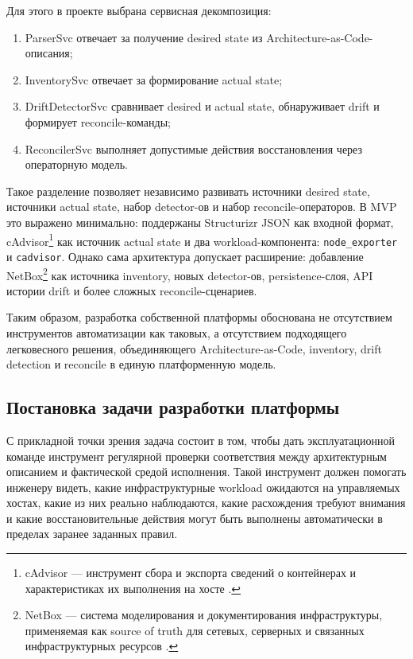 Для этого в проекте выбрана сервисная декомпозиция:
\begin{enumerate}
    \item ParserSvc отвечает за получение desired state из Architecture-as-Code-описания;
    \item InventorySvc отвечает за формирование actual state;
    \item DriftDetectorSvc сравнивает desired и actual state, обнаруживает drift и формирует reconcile-команды;
    \item ReconcilerSvc выполняет допустимые действия восстановления через операторную модель.
\end{enumerate}

Такое разделение позволяет независимо развивать источники desired state, источники actual state, набор detector-ов и набор reconcile-операторов. В MVP это выражено минимально: поддержаны Structurizr JSON как входной формат, cAdvisor\footnote{cAdvisor --- инструмент сбора и экспорта сведений о контейнерах и характеристиках их выполнения на хосте \cite{cadvisor_docs}.} как источник actual state и два workload-компонента: \texttt{node\_exporter} и \texttt{cadvisor}. Однако сама архитектура допускает расширение: добавление NetBox\footnote{NetBox --- система моделирования и документирования инфраструктуры, применяемая как source of truth для сетевых, серверных и связанных инфраструктурных ресурсов \cite{netbox_docs}.} как источника inventory, новых detector-ов, persistence-слоя, API истории drift и более сложных reconcile-сценариев.

Таким образом, разработка собственной платформы обоснована не отсутствием инструментов автоматизации как таковых, а отсутствием подходящего легковесного решения, объединяющего Architecture-as-Code, inventory, drift detection и reconcile в единую платформенную модель.

\subsection{Постановка задачи разработки платформы}

С прикладной точки зрения задача состоит в том, чтобы дать эксплуатационной команде инструмент регулярной проверки соответствия между архитектурным описанием и фактической средой исполнения. Такой инструмент должен помогать инженеру видеть, какие инфраструктурные workload ожидаются на управляемых хостах, какие из них реально наблюдаются, какие расхождения требуют внимания и какие восстановительные действия могут быть выполнены автоматически в пределах заранее заданных правил.

